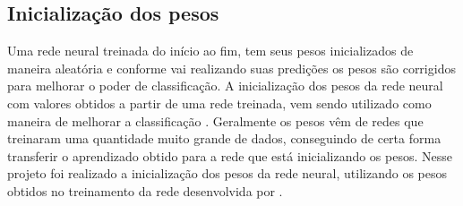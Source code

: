 \subsection{Inicialização dos pesos}
Uma rede neural treinada do início ao fim, tem seus pesos inicializados de maneira aleatória e conforme vai realizando suas predições os pesos são corrigidos para melhorar o poder de classificação. A inicialização dos pesos da rede neural com valores obtidos a partir de uma rede treinada, vem sendo utilizado como maneira de melhorar a classificação \cite{Girshick_2014_CVPR}. Geralmente os pesos vêm de redes que treinaram uma quantidade muito grande de dados, conseguindo de certa forma transferir o aprendizado obtido para a rede que está inicializando os pesos. Nesse projeto foi realizado a inicialização dos pesos da rede neural, utilizando os pesos obtidos no treinamento da rede desenvolvida por .




